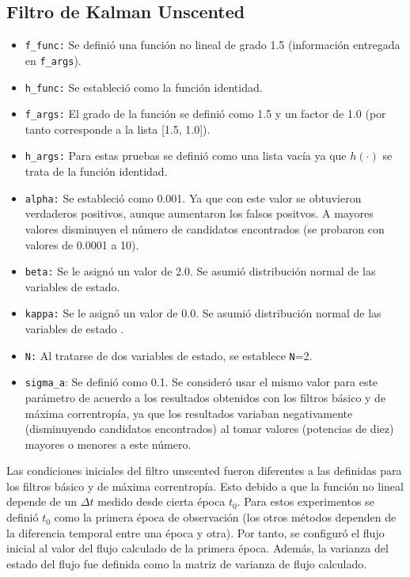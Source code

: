 \subsection*{Filtro de Kalman Unscented}
\begin{itemize}
\item \texttt{f\_func:} Se defini\'o una funci\'on no lineal de grado 1.5 (informaci\'on entregada en \texttt{f\_args}).
\item \texttt{h\_func:} Se estableci\'o como la funci\'on identidad.
\item \texttt{f\_args:} El grado de la funci\'on se defini\'o como 1.5 y un factor de 1.0 (por tanto corresponde a la lista [1.5, 1.0]).
\item \texttt{h\_args:} Para estas pruebas se defini\'o como una lista vac\'ia ya que $h(\cdot)$ se trata de la funci\'on identidad.
\item \texttt{alpha:} Se estableci\'o como 0.001. Ya que con este valor se obtuvieron verdaderos positivos, aunque aumentaron los falsos positvos. A mayores valores disminuyen el n\'umero de candidatos encontrados (se probaron con valores de 0.0001 a 10).
\item \texttt{beta:} Se le asign\'o un valor de 2.0. Se asumi\'o distribuci\'on normal de las variables de estado\cite{matsinos}. 
\item \texttt{kappa:} Se le asign\'o un valor de 0.0. Se asumi\'o distribuci\'on normal de las variables de estado \cite{matsinos}.
\item \texttt{N:} Al tratarse de dos variables de estado, se establece \texttt{N}=2.
\item \texttt{sigma\_a}: Se defini\'o como 0.1. Se consider\'o usar el mismo valor para este par\'ametro de acuerdo a los resultados obtenidos con los filtros b\'asico y de m\'axima correntrop\'ia, ya que los resultados variaban negativamente (disminuyendo candidatos encontrados) al tomar valores (potencias de diez) mayores o menores a este n\'umero.    
\end{itemize}
Las condiciones iniciales del filtro unscented fueron diferentes a las definidas para los filtros b\'asico y de m\'axima correntrop\'ia. Esto debido a que la funci\'on no lineal depende de un $\Delta t$ medido desde cierta \'epoca $t_0$. Para estos experimentos se defini\'o $t_0$ como la primera \'epoca de observaci\'on (los otros m\'etodos dependen de la diferencia temporal entre una \'epoca y otra). Por tanto, se configur\'o el flujo inicial al valor del flujo calculado de la primera \'epoca. Adem\'as, la varianza del estado del flujo fue definida como la matriz de varianza de flujo calculado.


